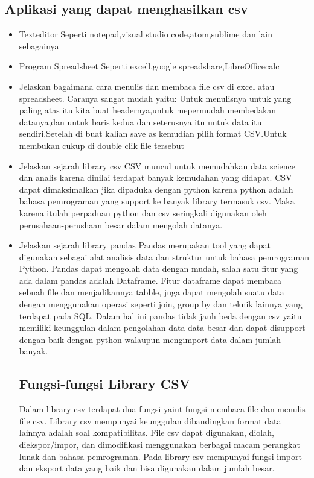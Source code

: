 \subsection{Aplikasi yang dapat menghasilkan csv}
\begin{itemize}
\item Texteditor
Seperti notepad,visual studio code,atom,sublime dan lain sebagainya
\item Program Spreadsheet
  Seperti excell,google spreadshare,LibreOfficecalc

 \item Jelaskan bagaimana cara menulis dan membaca file csv di excel atau spreadsheet.
Caranya sangat mudah yaitu:
 Untuk menulisnya untuk yang paling atas itu kita buat headernya,untuk mepermudah membedakan datanya,dan untuk baris kedua dan seterusnya itu untuk data itu sendiri.Setelah di buat kalian save as kemudian pilih format CSV.Untuk membukan cukup di double clik file tersebut

\item Jelaskan sejarah library csv
 CSV muncul untuk memudahkan data science dan analis karena dinilai terdapat banyak kemudahan yang didapat. CSV dapat dimaksimalkan jika dipaduka dengan python karena python adalah bahasa pemrograman yang support ke banyak library termasuk csv. Maka karena itulah perpaduan python dan csv seringkali digunakan oleh perusahaan-perushaan besar dalam mengolah datanya.

\item Jelaskan sejarah library pandas
 Pandas merupakan tool yang dapat digunakan sebagai alat analisis data dan struktur untuk bahasa pemrograman Python. Pandas dapat mengolah data dengan mudah, salah satu fitur yang ada dalam pandas adalah Dataframe. Fitur dataframe dapat membaca sebuah file dan menjadikannya tabble, juga dapat mengolah suatu data dengan menggunakan operasi seperti join, group by dan teknik lainnya yang terdapat pada SQL. Dalam hal ini pandas tidak jauh beda dengan csv yaitu memiliki keunggulan dalam pengolahan data-data besar dan dapat disupport dengan baik dengan python walaupun mengimport data dalam jumlah banyak.
\subsection{Fungsi-fungsi Library CSV}
Dalam library csv terdapat dua fungsi yaiut fungsi membaca file dan menulis file csv.
Library csv mempunyai keunggulan dibandingkan format data lainnya adalah soal kompatibilitas. File csv dapat digunakan, diolah, diekspor/impor, dan dimodifikasi menggunakan berbagai macam perangkat lunak dan bahasa pemrograman. Pada library csv mempunyai fungsi import dan eksport data yang baik dan bisa digunakan dalam jumlah besar.

\end{itemize}
